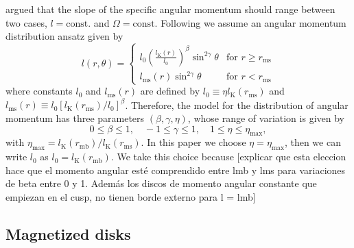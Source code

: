 \documentclass{aa}
\begin{document}
\cite{Jaroszynski:1980} argued that the slope of the specific angular momentum should range between two cases, $l = \mathrm{const.}$ and $\Omega = \mathrm{const}$. Following \citet{Qian:2009} we assume an angular momentum distribution ansatz given by  
\begin{equation}
l (r,\theta) = \left\{ \label{eq:ansatz} 
  \begin{array}{lr}
    l_0 \left(\frac{l_{\mathrm{K}}(r)}{l_0}\right)^{\beta}\sin^{2\gamma}{\theta} &  \text{for } r \geq r_{\mathrm{ms}}\\
    l_{\mathrm{ms}}(r)\sin^{2\gamma}{\theta} & \text{for } r < r_{\mathrm{ms}}
  \end{array}
\right.
\end{equation}
where constants $l_0$ and $l_{\mathrm{ms}}(r)$ are defined by $l_0 \equiv \eta l_{\mathrm{K}}(r_{\mathrm{ms}})$ and $l_{\mathrm{ms}}(r) \equiv l_0 [l_{\mathrm{K}}(r_{\mathrm{ms}})/l_0]^{\beta}$. Therefore, the model for the distribution of angular momentum has three parameters $(\beta, \gamma, \eta)$, whose range of variation is given by~\citep{Qian:2009}
\begin{equation}
0 \leq \beta \leq 1, \quad -1 \leq \gamma \leq 1, \quad 1 \leq \eta \leq \eta_{\mathrm{max}},
\end{equation}
with $\eta_{\mathrm{max}} = l_{\mathrm{K}}(r_{\mathrm{mb}})/l_{\mathrm{K}}(r_{\mathrm{ms}})$. In this paper we choose $\eta = \eta_{\mathrm{max}}$, then we can write $l_0$ as $l_0 = l_{\mathrm{K}}(r_{\mathrm{mb}})$. We take this choice because [explicar que esta eleccion hace que el momento angular esté comprendido entre lmb y lms para variaciones de beta entre 0 y 1. Además los discos de momento angular constante que empiezan en el cusp, no tienen borde externo para l = lmb]

\subsection{Magnetized disks}
\end{document}
